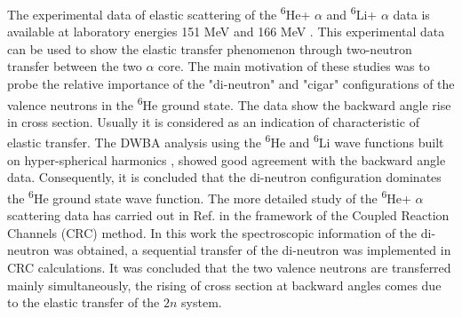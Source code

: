 \documentclass[
12pt, %
oneside, %
english, %
doublespacing, %
doublespacing, %
toctotoc, %
parskip, %
headsepline, %
]{MastersDoctoralThesis} %
\newcommand{\he}{\textsuperscript{6}He\xspace}
\newcommand{\li}{\textsuperscript{6}Li\xspace}
\begin{document}
The experimental data of elastic scattering of the \he + $\alpha$  and \li + $\alpha$ data is available at laboratory energies 151 MeV and 166 MeV \cite{ter1998two, oganessian1999dynamics}. 
This experimental data can be used to show the elastic transfer phenomenon through two-neutron transfer between the two $\alpha$ core. The main motivation of these studies was to probe the relative importance of the "di-neutron" and "cigar" configurations of the valence neutrons in the \he ground state. 
The data show the backward angle rise in cross section.
Usually it is considered as an indication of characteristic of elastic transfer. 
The DWBA analysis using the \he and \li wave functions built on hyper-spherical harmonics \cite{zhukov1993bound}, showed good agreement with the backward angle data.
Consequently, it is concluded that the di-neutron configuration dominates the \he ground state wave function.
The more detailed study of the \he + $\alpha$ scattering data has carried out in Ref. \cite{khoa2004di} in the framework of the Coupled Reaction Channels (CRC) method. 
In this work the spectroscopic information of the di-neutron was obtained, a sequential transfer of the di-neutron was implemented in CRC calculations. It was concluded that the two valence neutrons are transferred mainly simultaneously, the rising of cross section at backward angles comes due to the elastic transfer of the $2n$ system. 


\end{document}
